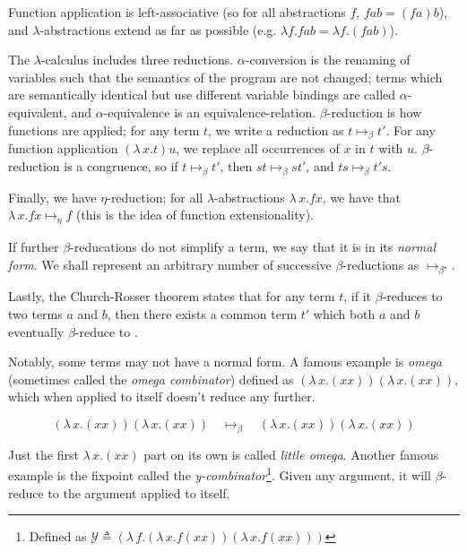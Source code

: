 \documentclass[logo,bsc,singlespacing,parskip,online]{infthesis}
\begin{document}
Function application is left-associative (so for all abstractions $f$, $f a b =
(f a) b$), and $\lambda$-abstractions extend as far as possible (e.g. $\lambda
f. f a b = \lambda f. (f a b)$).

The $\lambda$-calculus includes three reductions. $\alpha$-conversion is the
renaming of variables such that the semantics of the program are not changed;
terms which are semantically identical but use different variable bindings are
called $\alpha$-equivalent, and $\alpha$-equivalence is an equivalence-relation.
$\beta$-reduction is how functions are applied; for any term $t$, we write a
reduction as $t \mapsto_{\beta} t'$. For any function application $(\lambda \,
x. t) u$, we replace all occurrences of $x$ in $t$ with $u$. $\beta$-reduction
is a congruence, so if $t \mapsto_{\beta} t'$, then $st \mapsto_{\beta} st'$,
and $ts \mapsto_{\beta} t's$.

Finally, we have $\eta$-reduction; for all $\lambda$-abstractions $\lambda \, x.
f x$, we have that $\lambda \, x. f x \mapsto_{\eta} f$ (this is the idea of
function extensionality).
  
If further $\beta$-reducations do not simplify a term, we say that it is in its
\textit{normal form}. We shall represent an arbitrary number of successive
$\beta$-reductions as $\mapsto_{\beta^{\star}}$.

Lastly, the Church-Rosser theorem states that for any term $t$, if it
$\beta$-reduces to two terms $a$ and $b$, then there exists a common term $t'$
which both $a$ and $b$ eventually $\beta$-reduce to
\citep{church_properties_1936}.

Notably, some terms may not have a normal form. A famous example is
\textit{omega} (sometimes called the \textit{omega combinator}) defined as
$(\lambda \, x. (x x)) (\lambda \, x. (x x))$, which when applied to itself
doesn't reduce any further.

\begin{equation*}
  (\lambda \, x. (x x)) (\lambda \, x. (x x)) \quad \mapsto_{\beta} \quad (\lambda \, x. (x x)) (\lambda \, x. (x x))
\end{equation*}

Just the first $\lambda \, x. (x x)$ part on its own is called \textit{little
omega}. Another famous example is the fixpoint called the
\textit{y-combinator}\footnote{Defined as $\mathcal{Y} \triangleq (\lambda \, f.
(\lambda \, x. f (x x )) (\lambda \, x. f (xx)))$}. Given any argument, it will
$\beta$-reduce to the argument applied to itself.
\end{document}
